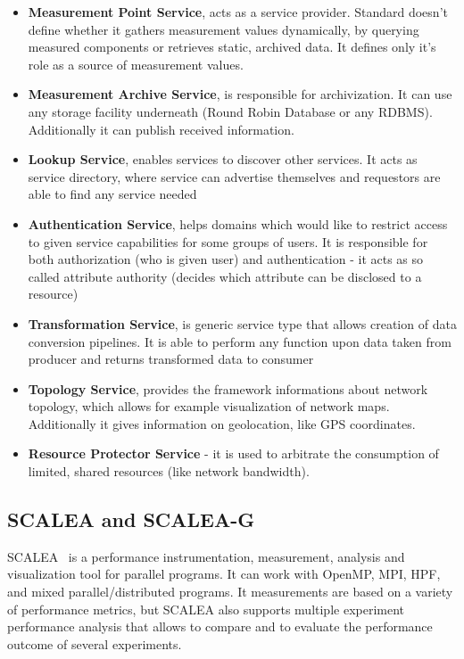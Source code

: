 \begin{itemize}
\item{ {\bf Measurement Point Service}, acts as a service provider. Standard doesn\rq{}t define whether it gathers measurement values dynamically, by querying measured components or retrieves static, archived data. It defines only it\rq{}s role as a source of measurement values. }
\item{ {\bf Measurement Archive Service}, is responsible for archivization. It can use any storage facility underneath (Round Robin Database or any RDBMS). Additionally it can publish received information. }
\item{ {\bf Lookup Service}, enables services to discover other services. It acts as service directory, where service can advertise themselves and requestors are able to find any service needed}
\item{ {\bf Authentication Service}, helps domains which would like to restrict access to given service capabilities for some groups of users. It is responsible for both authorization (who is given user) and authentication - it acts as so called attribute authority (decides which attribute can be disclosed to a resource)}
\item{ {\bf Transformation Service}, is generic service type that allows creation of data conversion pipelines. It is able to perform any function upon data taken from producer and returns transformed data to consumer}
\item{ {\bf Topology Service}, provides the framework informations about network topology, which allows for example visualization of network maps. Additionally it gives information on geolocation, like GPS coordinates.}
\item{ {\bf Resource Protector Service} - it is used to arbitrate the consumption of limited, shared resources (like network bandwidth).}
\end{itemize}




\subsection{SCALEA and SCALEA-G}

SCALEA~\cite{SCALEA1} is a performance instrumentation, measurement, analysis and visualization tool for
parallel programs. It can work with OpenMP, MPI, HPF, and
mixed parallel/distributed programs. It measurements are based on a variety of performance metrics, but SCALEA
also supports multiple experiment performance analysis that allows to compare and to evaluate the performance
outcome of several experiments.

